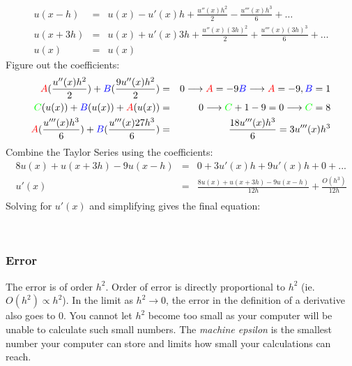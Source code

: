 \documentclass{article}
\newcommand{\red}[1]{\textcolor{red}{#1}}
\newcommand{\green}[1]{\textcolor{green}{#1}}
\newcommand{\blue}[1]{\textcolor{blue}{#1}}
\begin{document}
\begin{eqnarray*}
u(x-h) &=& u(x) - u'(x)h + \frac{u''(x)h^2}{2} - \frac{u'''(x)h^3}{6} + \ldots \\ 
u(x+3h) &=& u(x) + u'(x)3h + \frac{u''(x)(3h)^2}{2} + \frac{u'''(x)(3h)^3}{6} +  \ldots \\  
u(x) &=& u(x)
\end{eqnarray*}
Figure out the coefficients:
\begin{eqnarray*}
\red{A}(\frac{u''(x)h^2}{2}) + \blue{B}(\frac{9u''(x)h^2}{2}) &=& 0 \longrightarrow \red{A}=-9\blue{B} \longrightarrow  \red{A}=-9, \blue{B}=1\\ 
\green{C}(u(x)) + \blue{B}(u(x))+\red{A}(u(x)) &=& 0 \longrightarrow \green{C} + 1 - 9 = 0 \longrightarrow \green{C} = 8\\
\red{A}(\frac{u'''(x)h^3}{6}) + \blue{B}(\frac{u'''(x)27h^3}{6}) &=& \frac{18u'''(x)h^3}{6} = 3u'''(x)h^3\\
\end{eqnarray*}
Combine the Taylor Series using the coefficients:
\begin{eqnarray*}
8u(x)+u(x+3h)-9u(x-h) &=& 0+3u'(x)h+9u'(x)h+0+...\\
u'(x) &=& \frac{8u(x)+u(x+3h)-9u(x-h)}{12h} + \frac{O(h^3)}{12h}\\
\end{eqnarray*}
Solving for $u'(x)$ and simplifying gives the final equation:
\begin{center}
\\ 
\end{center}
\subsubsection{Error} The error is of order $h^2$. Order of error is directly proportional to $h^2$ (ie. $O(h^2) \propto h^2$). In the limit as $h^2 \to 0$, the error in the definition of a derivative also goes to 0. You cannot let $h^2$ become too small as your computer will be unable to calculate such small numbers. The \emph{machine epsilon} \label{machineepsilon} is the smallest number your computer can store and limits how small your calculations can reach.
\end{document}
